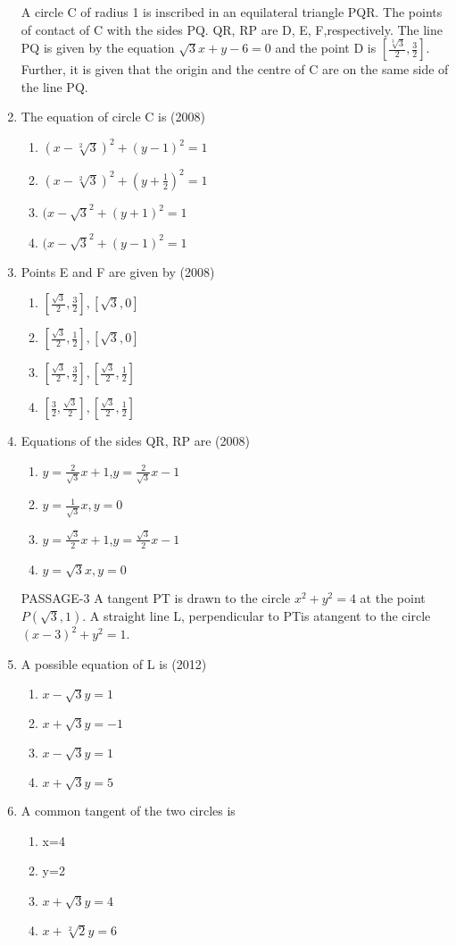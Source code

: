 \documentclass[12pt]{article}
\providecommand{\sbrak}[1]{\ensuremath{{}\left[#1\right]}}
\begin{document}
\begin{enumerate}
A circle C of radius 1 is inscribed in an equilateral triangle PQR. The points of contact of C with the sides PQ. QR, RP are D, E, F,respectively. The line PQ is given by the equation $\sqrt{3}x+y-6=0$ and the point D is $\sbrak{\frac{\sqrt[3]{3}}{2},\frac{3}{2}}$. Further, it is given that the origin  and the centre of C are on the same side of the line PQ. 
\item The equation of circle C is (2008) 
\begin{enumerate}
\item $(x-\sqrt[2]{3})^2+(y-1)^2=1$
\item $(x-\sqrt[2]{3})^2+(y+\frac{1}{2})^2=1$
\item $(x-\sqrt{3}^2+(y+1)^2=1$
\item $(x-\sqrt{3}^2+(y-1)^2=1$
\end{enumerate}
\item Points E and F are given by (2008) 
\begin{enumerate}
\item $\sbrak{\frac{\sqrt{3}}{2},\frac{3}{2}},\sbrak{\sqrt{3},0}$
\item $\sbrak{\frac{\sqrt{3}}{2},\frac{1}{2}},\sbrak{\sqrt{3},0}$
\item $\sbrak{\frac{\sqrt{3}}{2},\frac{3}{2}},\sbrak{\frac{\sqrt{3}}{2},\frac{1}{2}}$
\item $\sbrak{\frac{3}{2},\frac{\sqrt{3}}{2}},\sbrak{\frac{\sqrt{3}}{2},\frac{1}{2}}$
\end{enumerate}
\item Equations of the sides QR, RP are (2008) 
\begin{enumerate}
\item $y=\frac{2}{\sqrt{3}}x+1$,$y=\frac{2}{\sqrt{3}}x-1$
\item $y=\frac{1}{\sqrt{3}}x,y=0$
\item $y=\frac{\sqrt{3}}{2}x+1$,$y=\frac{\sqrt{3}}{2}x-1$
\item $y=\sqrt{3}x,y=0$
\end{enumerate}

PASSAGE-3
A tangent PT is drawn to the circle $x^2+y^2=4$ at the point $P(\sqrt{3},1)$. A straight line L, perpendicular to PTis atangent to the circle $(x-3)^2+y^2=1$.
\item A possible equation of L is (2012)
\begin{enumerate}
\item $x-\sqrt{3}y=1$
\item $x+\sqrt{3}y=-1$
\item $x-\sqrt{3}y=1$
\item $x+\sqrt{3}y=5$
\end{enumerate}
\item A common tangent of the two circles is 
\begin{enumerate}
\item x=4
\item y=2
\item $x+\sqrt{3}y=4$
\item $x+\sqrt[2]{2}y=6$
\end{enumerate}


\end{enumerate}
\end{document}
